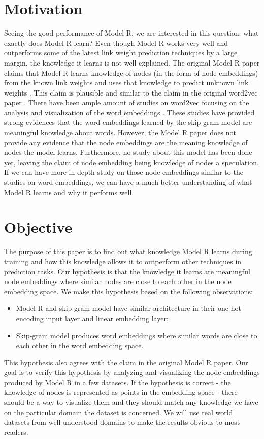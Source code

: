 \documentclass[conference]{IEEEtran}
\begin{document}
\section{Motivation}
Seeing the good performance of Model R, we are interested in this question: what exactly does Model R learn?
Even though Model R works very well and outperforms some of the latest link weight prediction techniques by a large margin, the knowledge it learns is not well explained.
The original Model R paper claims that Model R learns knowledge of nodes (in the form of node embeddings) from the known link weights and uses that knowledge to predict unknown link weights \cite{hou2017deep}.
This claim is plausible and similar to the claim in the original word2vec paper \cite{mikolov2013efficient}.
There have been ample amount of studies on word2vec focusing on the analysis and visualization of the word embeddings \cite{mikolov2013distributed} \cite{mikolov2013linguistic}.
These studies have provided strong evidences that the word embeddings learned by the skip-gram model are meaningful knowledge about words.
However, the Model R paper does not provide any evidence that the node embeddings are the meaning knowledge of nodes the model learns.
Furthermore, no study about this model has been done yet, leaving the claim of node embedding being knowledge of nodes a speculation.
If we can have more in-depth study on those node embeddings similar to the studies on word embeddings, we can have a much better understanding of what Model R learns and why it performs well.

\section{Objective}
The purpose of this paper is to find out what knowledge Model R learns during training and how this knowledge allows it to outperform other techniques in prediction tasks.
Our hypothesis is that the knowledge it learns are meaningful node embeddings where similar nodes are close to each other in the node embedding space.
We make this hypothesis based on the following observations:
\begin{itemize}
	\item Model R and skip-gram model have similar architecture in their one-hot encoding input layer and linear embedding layer;
	\item Skip-gram model produces word embeddings where similar words are close to each other in the word embedding space.
\end{itemize}
This hypothesis also agrees with the claim in the original Model R paper.
Our goal is to verify this hypothesis by analyzing and visualizing the node embeddings produced by Model R in a few datasets.
If the hypothesis is correct - the knowledge of nodes is represented as points in the embedding space - there should be a way to visualize them and they should match any knowledge we have on the particular domain the dataset is concerned.
We will use real world datasets from well understood domains to make the results obvious to most readers.
\end{document}
